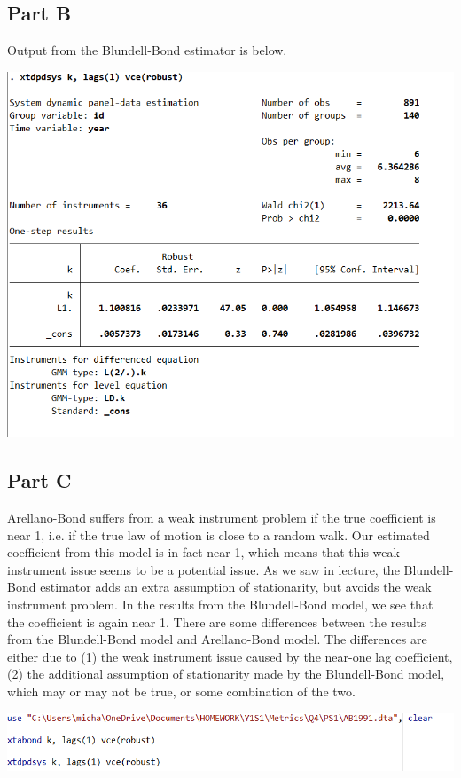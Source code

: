 \documentclass[11pt]{article} %
\begin{document}
\subsection{Part B}
Output from the Blundell-Bond estimator is below.

\includegraphics{p9}

\subsection{Part C}

Arellano-Bond suffers from a weak instrument problem if the true coefficient is near 1, i.e. if the true law of motion is close to a random walk. Our estimated coefficient from this model is in fact near 1, which means that this weak instrument issue seems to be a potential issue. As we saw in lecture, the Blundell-Bond estimator adds an extra assumption of stationarity, but avoids the weak instrument problem. In the results from the Blundell-Bond model, we see that the coefficient is again near 1. There are some differences between the results from the Blundell-Bond model and Arellano-Bond model. The differences are either due to (1) the weak instrument issue caused by the near-one lag coefficient, (2) the additional assumption of stationarity made by the Blundell-Bond model, which may or may not be true, or some combination of the two.

\includegraphics[scale=0.75]{p10}
\end{document}
